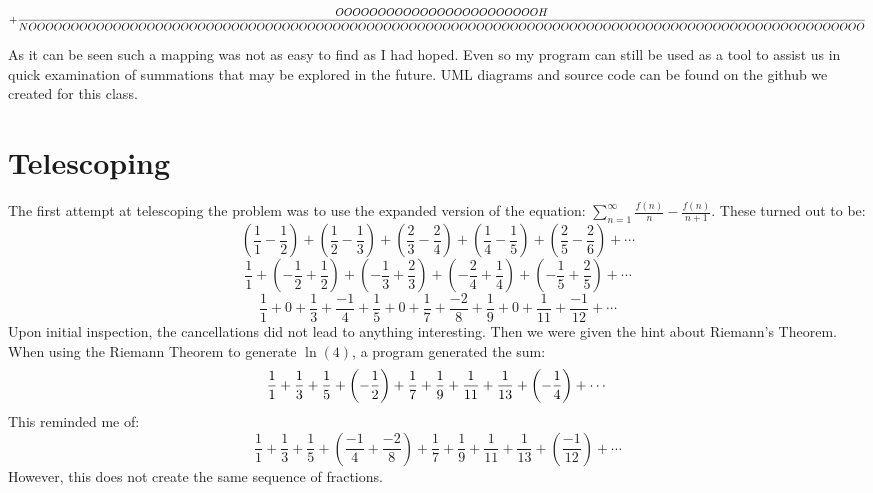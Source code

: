 \documentclass{article}
\begin{document}
$$
+{OOOOOOOOOOOOOOOOOOOOOOOOH \over NOOOOOOOOOOOOOOOOOOOOOOOOOOOOOOOOOOOOOOOOOOOOOOOOOOOOOOOOOOOOOOOOOOOOOOOOOOOOOOOOOOOOOOOOOOOOOOOOOOO}
$$

As it can be seen such a mapping was not as easy to find as I had hoped. Even so my program can still be used as a tool to assist us in quick examination of
summations that may be explored in the future. UML diagrams and source code can be found on the github we created for this class.

\section{Telescoping}
The first attempt at telescoping the problem was to use the expanded version of the equation: $\sum_{n=1}^\infty \frac{f(n)}{n} - \frac{f(n)}{n+1}$. These turned out to be:\\
$$\left(\frac{1}{1}-\frac{1}{2}\right)+\left(\frac{1}{2}-\frac{1}{3}\right)+\left(\frac{2}{3}-\frac{2}{4}\right)+\left(\frac{1}{4}-\frac{1}{5}\right)+\left(\frac{2}{5}-\frac{2}{6}\right)+\cdots$$
$$\frac{1}{1} + \left(-\frac{1}{2}+\frac{1}{2}\right) + \left(-\frac{1}{3}+\frac{2}{3}\right) +\left(-\frac{2}{4}+\frac{1}{4}\right)+\left(-\frac{1}{5}+\frac{2}{5}\right)+\cdots$$
$$\frac{1}{1}+0+\frac{1}{3}+\frac{-1}{4}+\frac{1}{5}+0+\frac{1}{7}+\frac{-2}{8}+\frac{1}{9}+0+\frac{1}{11}+\frac{-1}{12}+\cdots$$
Upon initial inspection, the cancellations did not lead to anything interesting. Then we were given the hint about Riemann's Theorem. When using the Riemann Theorem to generate $\ln(4)$, a program generated the sum:
$${1 \over 1}+{1 \over 3}+{1 \over 5}+\left(- {1 \over 2}\right)+{1 \over 7}+{1 \over 9}+{1 \over 11}+{1 \over 13}+\left(- {1 \over 4}\right)+ \cdots$$
This reminded me of:
$$\frac{1}{1}+\frac{1}{3}+\frac{1}{5}+\left(\frac{-1}{4}+\frac{-2}{8}\right)+\frac{1}{7}+\frac{1}{9}+\frac{1}{11}+\frac{1}{13}+\left(\frac{-1}{12}\right)+\cdots$$
However, this does not create the same sequence of fractions.
\end{document}
